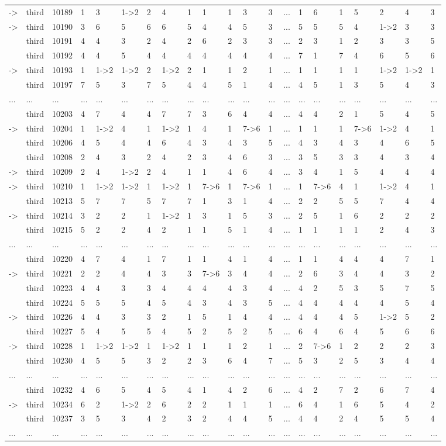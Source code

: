 \documentclass[6pt]{article}
\begin{document}
\begin{landscape}
{\begin{longtable}{lllllllllllllllllllll}
-\textgreater &third&10189&1&3&1-\textgreater 2&2&4&1&1&1&3&3&...&1&6&1&5&2&4&3\tabularnewline
\newpage
-\textgreater &third&10190&3&6&5&6&6&5&4&4&5&3&...&5&5&5&4&1-\textgreater 2&3&3\tabularnewline
&third&10191&4&4&3&2&4&2&6&2&3&3&...&2&3&1&2&3&3&5\tabularnewline
&third&10192&4&4&5&4&4&4&4&4&4&4&...&7&1&7&4&6&5&6\tabularnewline
-\textgreater &third&10193&1&1-\textgreater 2&1-\textgreater 2&2&1-\textgreater 2&2&1&1&2&1&...&1&1&1&1&1-\textgreater 2&1-\textgreater 2&1\tabularnewline
&third&10197&7&5&3&7&5&4&4&5&1&4&...&4&5&1&3&5&4&3\tabularnewline
...&...&...&...&...&...&...&...&...&...&...&...&...&...&...&...&...&...&...&...&...\tabularnewline
&third&10203&4&7&4&4&7&7&3&6&4&4&...&4&4&2&1&5&4&5\tabularnewline
-\textgreater &third&10204&1&1-\textgreater 2&4&1&1-\textgreater 2&1&4&1&7-\textgreater 6&1&...&1&1&1&7-\textgreater 6&1-\textgreater 2&4&1\tabularnewline
&third&10206&4&5&4&4&6&4&3&4&3&5&...&4&3&4&3&4&6&5\tabularnewline
&third&10208&2&4&3&2&4&2&3&4&6&3&...&3&5&3&3&4&3&4\tabularnewline
-\textgreater &third&10209&2&4&1-\textgreater 2&2&4&1&1&4&6&4&...&3&4&1&5&4&4&4\tabularnewline
-\textgreater &third&10210&1&1-\textgreater 2&1-\textgreater 2&1&1-\textgreater 2&1&7-\textgreater 6&1&7-\textgreater 6&1&...&1&7-\textgreater 6&4&1&1-\textgreater 2&4&1\tabularnewline
&third&10213&5&7&7&5&7&7&1&3&1&4&...&2&2&5&5&7&4&4\tabularnewline
-\textgreater &third&10214&3&2&2&1&1-\textgreater 2&1&3&1&5&3&...&2&5&1&6&2&2&2\tabularnewline
&third&10215&5&2&2&4&2&1&1&5&1&4&...&1&1&1&1&2&4&3\tabularnewline
...&...&...&...&...&...&...&...&...&...&...&...&...&...&...&...&...&...&...&...&...\tabularnewline
&third&10220&4&7&4&1&7&1&1&4&1&4&...&1&1&4&4&4&7&1\tabularnewline
-\textgreater &third&10221&2&2&4&4&3&3&7-\textgreater 6&3&4&4&...&2&6&3&4&4&3&2\tabularnewline
&third&10223&4&4&3&3&4&4&4&4&3&4&...&4&2&5&3&5&7&5\tabularnewline
&third&10224&5&5&5&4&5&4&3&4&3&5&...&4&4&4&4&4&5&4\tabularnewline
-\textgreater &third&10226&4&4&3&3&2&1&5&1&4&4&...&4&4&4&5&1-\textgreater 2&5&2\tabularnewline
&third&10227&5&4&5&5&4&5&2&5&2&5&...&6&4&6&4&5&6&6\tabularnewline
-\textgreater &third&10228&1&1-\textgreater 2&1-\textgreater 2&1&1-\textgreater 2&1&1&1&2&1&...&2&7-\textgreater 6&1&2&2&2&3\tabularnewline
&third&10230&4&5&5&3&2&2&3&6&4&7&...&5&3&2&5&3&4&4\tabularnewline
...&...&...&...&...&...&...&...&...&...&...&...&...&...&...&...&...&...&...&...&...\tabularnewline
&third&10232&4&6&5&4&5&4&1&4&2&6&...&4&2&7&2&6&7&4\tabularnewline
-\textgreater &third&10234&6&2&1-\textgreater 2&2&6&2&2&1&1&1&...&6&4&1&6&5&4&2\tabularnewline
&third&10237&3&5&3&4&2&3&2&4&4&5&...&4&4&2&4&5&5&4\tabularnewline
...&...&...&...&...&...&...&...&...&...&...&...&...&...&...&...&...&...&...&...&...\tabularnewline
\hline
\end{longtable}}\end{landscape}
\end{document}
